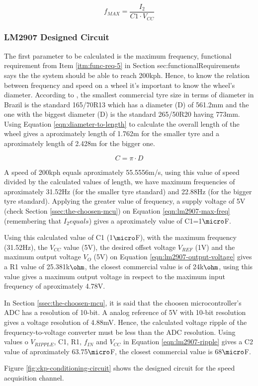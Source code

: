 			\begin{equation}\label{eqn:lm2907-max-freq}
				f_{MAX} = \frac{I_{2}}{C1 \cdot V_{CC}}
			\end{equation}

		\subsubsection{LM2907 Designed Circuit}\label{sssec:lm2907-designed-circuit}

			The first parameter to be calculated is the maximum frequency, functional requirement from Item \ref{itm:func-req-5} in Section {sec:functionalRequirements} says the the system should be able to reach 200kph. Hence, to know the relation between frequency and speed on a wheel it's important to know the wheel's diameter. According to \cite{pneus-facil-todas-as-medidas-de-pneu}, the smallest commercial tyre size in terms of diameter in Brazil is the standard 165/70R13 which has a diameter (D) of 561.2mm and the one with the biggest diameter (D) is the standard 265/50R20 having 773mm. Using Equation \ref{eqn:diameter-to-length} to calculate the overall length of the wheel gives a aproximately length of 1.762m for the smaller tyre and a aproximately length of 2.428m for the bigger one.

			\begin{equation}\label{eqn:diameter-to-length}
				C = \pi \cdot D
			\end{equation}

			A speed of 200kph equals aproximately 55.5556m/s, using this value of speed divided by the calculated values of length, we have maximum frequencies of aproximately 31.52Hz (for the smaller tyre standard) and 22.88Hz (for the bigger tyre standard). Applying the greater value of frequency, a supply voltage of 5V (check Section \ref{ssec:the-choosen-mcu}) on Equation \ref{eqn:lm2907-max-freq} (remembering that $I_{2} equals$) gives a aproximately value of C1=1$\micro$F.
			\par
			Using this calculated value of C1 (1$\micro$F), with the maximum frequency (31.52Hz), the $V_{CC}$ value (5V), the desired offset voltage $V_{REF}$ (1V) and the maximum output voltage $V_{O}$ (5V) on Equation \ref{eqn:lm2907-output-voltage} gives a R1 value of 25.381k$\ohm$, the closest commercial value is of 24k$\ohm$, using this value gives a maximum output voltage in respect to the maximum input frequency of aproximately 4.78V.
			\par
			In Section \ref{ssec:the-choosen-mcu}, it is said that the choosen microcontroller's ADC has a resolution of 10-bit. A analog reference of 5V with 10-bit resolution gives a voltage resolution of 4.88mV. Hence, the calculated voltage ripple of the frequency-to-voltage converter must be less than the ADC resolution. Using values o $V_{RIPPLE}$, C1, R1, $f_{IN}$ and $V_{CC}$ in Equation \ref{eqn:lm2907-ripple} gives a C2 value of aproximately 63.75$\micro$F, the closest commercial value is 68$\micro$F.
			\par
			Figure \ref{fig:ckp-conditioning-circuit} shows the designed circuit for the speed acquisition channel.

